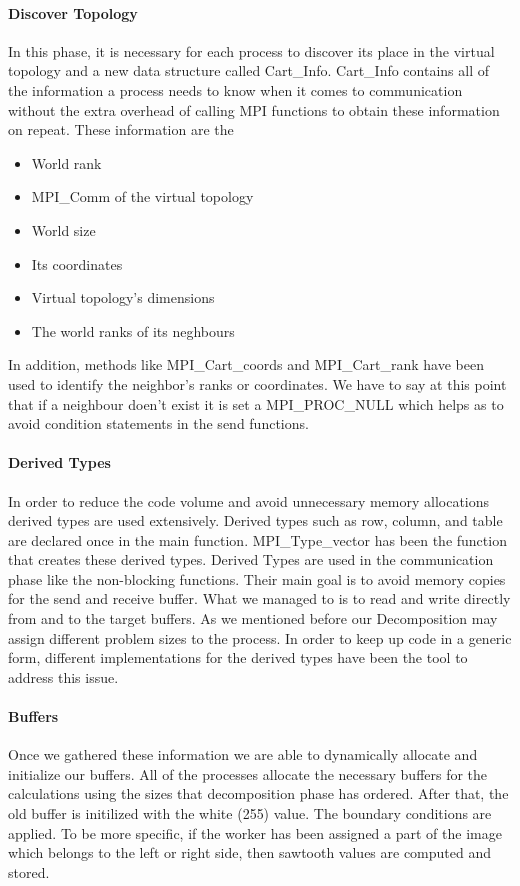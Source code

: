 \documentclass[12pt,a4paper]{article}
\begin{document}
      \paragraph{Discover Topology}
        In this phase, it is necessary for each process to discover its place in the virtual topology and a new data structure called Cart\_Info. Cart\_Info contains all of the information a process needs to know when it comes to communication without the extra overhead of calling MPI functions to obtain these information on repeat. These information are the

      \begin{itemize}
			  \item World rank
			  \item MPI\_Comm of the virtual topology
			  \item World size
			  \item Its coordinates
			  \item Virtual topology's dimensions
			  \item The world ranks of its neghbours
			\end{itemize}

			In addition, methods like MPI\_Cart\_coords and MPI\_Cart\_rank have been used to identify the neighbor's ranks or coordinates. We have to say at this point that if a neighbour doen't exist it is set a MPI\_PROC\_NULL which helps as to avoid condition statements in the send functions.

        \paragraph{Derived Types}
            In order to reduce the code volume and avoid unnecessary memory allocations derived types are used extensively. Derived types such as row, column, and table are declared once in the main function. MPI\_Type\_vector has been the function that creates these derived types. Derived Types are used in the communication phase like the non-blocking functions. Their main goal is to avoid memory copies for the send and receive buffer. What we managed to is to read and write directly from and to the target buffers. As we mentioned before our Decomposition may assign different problem sizes to the process. In order to keep up code in a generic form, different implementations for the derived types have been the tool to address this issue.

        \paragraph{Buffers}
			Once we gathered these information we are able to dynamically allocate and initialize our buffers. All of the processes allocate the necessary buffers for the calculations using the sizes that decomposition phase has ordered. After that, the old buffer is initilized with the white (255) value. The boundary conditions are applied. To be more specific, if the worker has been assigned a part of the image which belongs to the left or right side, then sawtooth values are computed and stored.
\end{document}
